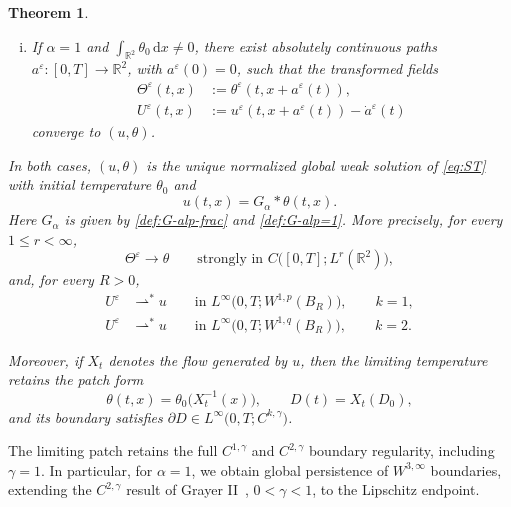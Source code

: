 \documentclass[reqno,11pt,a4paper]{amsart}
\newtheorem{theorem}{Theorem}[section]
\newcommand{\dd}{\mathrm{d}}
\begin{document}
\begin{theorem}
\begin{enumerate}[(i)]
\item
If $\alpha=1$ and $\int_{\mathbb R^2}\theta_0\,\dd x\ne0$,
there exist absolutely continuous paths
$a^\varepsilon:[0,T]\to\mathbb R^2$,
with $a^\varepsilon(0)=0$, such that the transformed fields
\begin{equation}\label{def:Theta-U-eps}
  \begin{aligned}
    \Theta^\varepsilon(t,x)
    &:=\theta^\varepsilon(t,x+a^\varepsilon(t)),\\
    U^\varepsilon(t,x)
    &:=u^\varepsilon(t,x+a^\varepsilon(t))
       -\dot a^\varepsilon(t)
  \end{aligned}
\end{equation}
converge to $(u,\theta)$.
\end{enumerate}
In both cases, $(u,\theta)$ is the unique normalized global
weak solution of \eqref{eq:ST} with initial temperature
$\theta_0$ and
\begin{equation}\label{eq:norm-u-exp-ST}
  u(t,x)=G_\alpha*\theta(t,x).
\end{equation}
Here $G_\alpha$ is given by
\eqref{def:G-alp-frac} and \eqref{def:G-alp=1}.
More precisely, for every $1\leq r<\infty$,
\[
  \Theta^\varepsilon\longrightarrow\theta
  \qquad\text{strongly in }
  C\bigl([0,T];L^r(\mathbb R^2)\bigr),
\]
and, for every $R>0$,
\begin{align*}
  U^\varepsilon
  &\rightharpoonup^\ast u
  \qquad\text{in }
  L^\infty\bigl(0,T;W^{1,p}(B_R)\bigr),
  \qquad k=1,\\
  U^\varepsilon
  &\rightharpoonup^\ast u
  \qquad \text{in }
  L^\infty\bigl(0,T;W^{1,q}(B_R)\bigr),
  \qquad k=2.
\end{align*}

Moreover, if $X_t$ denotes the flow generated by $u$,
then the limiting temperature retains the patch form
\[
  \theta(t,x)=\theta_0\bigl(X_t^{-1}(x)\bigr),
  \qquad D(t)=X_t(D_0),
\]
and its boundary satisfies $\partial D\in L^\infty\bigl(0,T;C^{k,\gamma}\bigr)$. 
\end{theorem}
 
The limiting patch retains the full $C^{1,\gamma}$ and $C^{2,\gamma}$
boundary regularity, including $\gamma=1$.
In particular, for $\alpha=1$, we obtain global persistence
of $W^{3,\infty}$ boundaries, extending
the $C^{2,\gamma}$ result of Grayer II~\cite{Gray23},
$0<\gamma<1$, to the Lipschitz endpoint.
\end{document}
